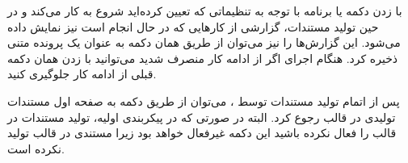 با زدن دکمه  یا  برنامه  با توجه به
تنظیماتی که تعیین کرده‌اید شروع به کار می‌کند و در حین تولید مستندات، گزارشی از
کارهایی که در حال انجام است نیز نمایش داده می‌شود. این گزارش‌ها را نیز می‌توان
از طریق همان دکمه  به عنوان یک پرونده متنی ذخیره کرد. هنگام اجرای
 اگر از ادامه کار منصرف شدید می‌توانید با زدن همان دکمه قبلی از
ادامه کار  جلوگیری کنید.

پس از اتمام تولید مستندات توسط ، می‌توان از طریق دکمه  به صفحه اول مستندات تولیدی در قالب  رجوع کرد. البته در صورتی که
در پیکربندی اولیه، تولید مستندات در قالب  را فعال نکرده باشید این دکمه
غیرفعال خواهد بود زیرا  مستندی در قالب  تولید نکرده است.